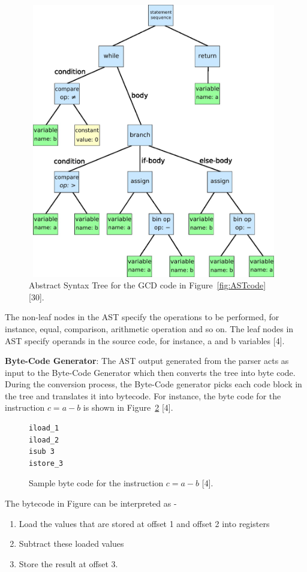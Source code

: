 \begin{figure}
  \centering
      \includegraphics[width=11cm, height=12cm]{AST.jpg}
    \caption[Abstract Syntax Tree]{Abstract Syntax Tree for the GCD code in Figure~\ref{fig:ASTcode} [30].}
    \label{fig:AST}
\end{figure}
The non-leaf nodes in the AST specify the operations to be performed, for instance, equal, comparison, arithmetic operation and so on. The leaf nodes in AST specify operands in the source code, for instance, a and b variables [4]. 

\textbf{Byte-Code Generator}: The AST output generated from the parser acts as input to the Byte-Code Generator which then converts the tree into byte code. During the conversion process, the Byte-Code generator picks each code block in the tree and translates it into bytecode. For instance, the byte code for the instruction $c = a - b$ is shown in Figure~\ref{fig:samplebytecode} [4].

\begin{figure}
  \centering
\begin{lstlisting}
iload_1
iload_2
isub 3
istore_3
\end{lstlisting}
    \caption[Sample byte code]{Sample byte code for the instruction $c = a - b$ [4].}
    \label{fig:samplebytecode}
\end{figure}

The bytecode in Figure can be interpreted as - 
\begin{enumerate}
\item Load the values that are stored at offset 1 and offset 2 into registers
\item Subtract these loaded values 
\item Store the result at offset 3.
\end{enumerate}


